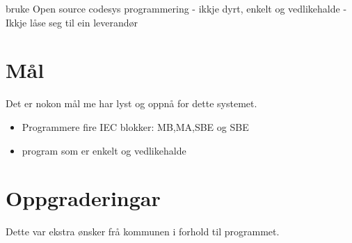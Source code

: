 bruke Open source codesys programmering
- ikkje dyrt, enkelt og vedlikehalde
- Ikkje låse seg til ein leverandør

\section{Mål}
Det er nokon mål me har lyst og oppnå for dette systemet.

\begin{itemize}
    \item Programmere fire IEC blokker: MB,MA,SBE og SBE
    \item program som er enkelt og vedlikehalde
\end{itemize}

\section{Oppgraderingar}

Dette var ekstra ønsker frå kommunen i forhold til programmet. 